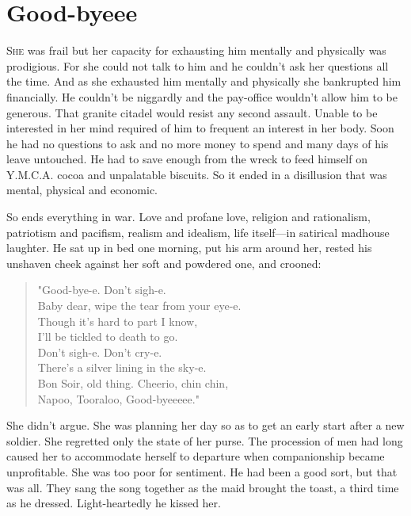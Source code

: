 \chapter*{\textsf{Good-byeee}}

S\textsc{he} was frail but her capacity for exhausting him mentally and physically was prodigious. For she could not talk to him and he couldn't ask her questions all the time. And as she exhausted him mentally and physically she bankrupted him financially. He couldn't be niggardly and the pay-office wouldn't allow him to be generous. That granite citadel would resist any second assault. Unable to be interested in her mind required of him to frequent an interest in her body. Soon he had no questions to ask and no more money to spend and many days of his leave untouched. He had to save enough from the wreck to feed himself on Y.M.C.A. cocoa and unpalatable biscuits. So it ended in a disillusion that was mental, physical and economic.

So ends everything in war. Love and profane love, religion and rationalism, patriotism and pacifism, realism and idealism, life itself---in satirical madhouse laughter. He sat up in bed one morning, put his arm around her, rested his unshaven cheek against her soft and powdered one, and crooned:

\begin{verse}
"Good-bye-e. Don't sigh-e.\\
Baby dear, wipe the tear from your eye-e.\\
Though it's hard to part I know,\\
I'll be tickled to death to go.\\
Don't sigh-e. Don't cry-e.\\
There's a silver lining in the sky-e.\\
Bon Soir, old thing. Cheerio, chin chin,\\
Napoo, Tooraloo, Good-byeeeee."\\
\end{verse}

She didn't argue. She was planning her day so as to get an early start after a new soldier. She regretted only the state of her purse. The procession of men had long caused her to accommodate herself to departure when companionship became unprofitable. She was too poor for sentiment. He had been a good sort, but that was all. They sang the song together as the maid brought the toast, a third time as he dressed. Light-heartedly he kissed her.


